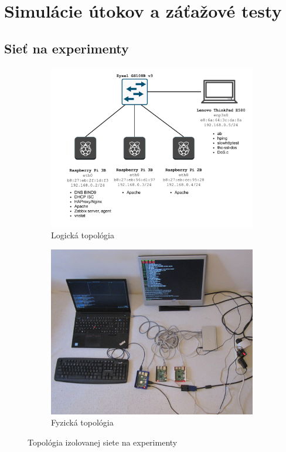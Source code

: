 \documentclass[12pt, a4paper]{article}
\begin{document}
\section{Simulácie útokov a záťažové testy}

\subsection{Sieť na experimenty}
\begin{figure}[h!]
	\centering
	\begin{subfigure}[t]{.48\textwidth}
  		\centering
  		\includegraphics[width=\textwidth]{images/topology.png}
  		\caption{Logická topológia}
	\end{subfigure}
	\begin{subfigure}[t]{.48\textwidth}
  		\centering
  		\includegraphics[width=\textwidth]{images/net.JPG}
  		\caption{Fyzická topológia}
	\end{subfigure}
	\caption{Topológia izolovanej siete na experimenty}
\end{figure}
\end{document}
